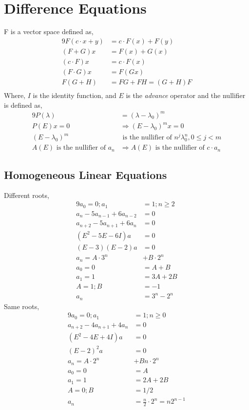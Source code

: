 \documentclass[12pt]{article}%
\begin{document}
\section{Difference Equations}
F is a vector space defined as,
\begin{alignat*}{9}
F(c\cdot x + y) &= c\cdot F(x) + F(y) \\
(F+G)x &= F(x) + G(x) \\
(c\cdot F)x &= c\cdot F(x) \\
(F\cdot G)x &= F(Gx) \\
F(G+H) &= FG + FH = (G+H)F\\
\end{alignat*}
Where, $I$ is the identity function, and $E$ is the \textit{advance} operator and the nullifier is defined as,
\begin{alignat*}{9}
P(\lambda) &= (\lambda - \lambda_0)^m \\
P(E)x = 0 &\Rightarrow (E-\lambda_0)^m x = 0 \\
(E-\lambda_0) ^m &\text{ is the nullifier of } n^j\lambda^n_0, 0\leq j < m \\
A(E) \text{ is the nullifier of } a_n &\Rightarrow A(E) \text{ is the nullifier of } c\cdot a_n
\end{alignat*}

\subsection{Homogeneous Linear Equations}
Different roots,
\begin{alignat*}{9}
a_{0} = 0; a_{1} &= 1; n\geq 2 \\
a_{n} - 5a_{n-1} + 6a_{n-2} &= 0 \\
a_{n+2} - 5a_{n+1} + 6a_{n} &= 0 \\
(E^2 - 5E - 6I)a &= 0 \\
(E-3)(E-2)a &= 0 \\
a_n = A\cdot 3^n &+ B\cdot 2^n \\
a_0 = 0 &= A + B \\
a_1 = 1 &= 3A + 2B \\
A = 1; B &= -1 \\
a_n &= 3^n - 2^n
\end{alignat*}
Same roots,
\begin{alignat*}{9}
a_{0} = 0; a_{1} &= 1; n\geq 0 \\
a_{n+2} - 4a_{n+1} + 4a_{n} &= 0 \\
(E^2 - 4E + 4I)a &= 0 \\
(E-2)^2a &= 0 \\
a_n = A\cdot 2^n &+ Bn\cdot 2^n \\
a_0 = 0 &= A \\
a_1 = 1 &= 2A + 2B \\
A = 0; B &= 1/2 \\
a_n &= \frac{n}{2} \cdot 2^n = n2^{n-1}
\end{alignat*}
\end{document}
